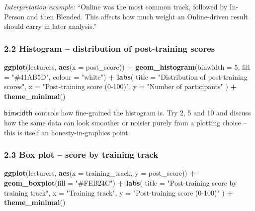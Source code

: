 \documentclass[11pt]{article}
\newenvironment{Shaded}{\begin{snugshade}}{\end{snugshade}}
\newcommand{\AttributeTok}[1]{\textcolor[rgb]{0.13,0.29,0.53}{#1}}
\newcommand{\DecValTok}[1]{\textcolor[rgb]{0.00,0.00,0.81}{#1}}
\newcommand{\FunctionTok}[1]{\textcolor[rgb]{0.13,0.29,0.53}{\textbf{#1}}}
\newcommand{\NormalTok}[1]{#1}
\newcommand{\SpecialCharTok}[1]{\textcolor[rgb]{0.81,0.36,0.00}{\textbf{#1}}}
\newcommand{\StringTok}[1]{\textcolor[rgb]{0.31,0.60,0.02}{#1}}
\begin{document}
\emph{Interpretation example:} ``Online was the most common track,
followed by In-Person and then Blended. This affects how much weight an
Online-driven result should carry in later analysis.''

\hypertarget{histogram-distribution-of-post-training-scores}{%
\subsubsection{2.2 Histogram -- distribution of post-training
scores}\label{histogram-distribution-of-post-training-scores}}

\begin{Shaded}
\begin{Highlighting}[]
\FunctionTok{ggplot}\NormalTok{(lecturers, }\FunctionTok{aes}\NormalTok{(}\AttributeTok{x =}\NormalTok{ post\_score)) }\SpecialCharTok{+}
  \FunctionTok{geom\_histogram}\NormalTok{(}\AttributeTok{binwidth =} \DecValTok{5}\NormalTok{, }\AttributeTok{fill =} \StringTok{"\#41AB5D"}\NormalTok{, }\AttributeTok{colour =} \StringTok{"white"}\NormalTok{) }\SpecialCharTok{+}
  \FunctionTok{labs}\NormalTok{(}
    \AttributeTok{title =} \StringTok{"Distribution of post{-}training scores"}\NormalTok{,}
    \AttributeTok{x =} \StringTok{"Post{-}training score (0{-}100)"}\NormalTok{, }\AttributeTok{y =} \StringTok{"Number of participants"}
\NormalTok{  ) }\SpecialCharTok{+}
  \FunctionTok{theme\_minimal}\NormalTok{()}
\end{Highlighting}
\end{Shaded}

\texttt{binwidth} controls how fine-grained the histogram is. Try 2, 5
and 10 and discuss how the same data can look smoother or noisier purely
from a plotting choice -- this is itself an honesty-in-graphics point.

\hypertarget{box-plot-score-by-training-track}{%
\subsubsection{2.3 Box plot -- score by training
track}\label{box-plot-score-by-training-track}}

\begin{Shaded}
\begin{Highlighting}[]
\FunctionTok{ggplot}\NormalTok{(lecturers, }\FunctionTok{aes}\NormalTok{(}\AttributeTok{x =}\NormalTok{ training\_track, }\AttributeTok{y =}\NormalTok{ post\_score)) }\SpecialCharTok{+}
  \FunctionTok{geom\_boxplot}\NormalTok{(}\AttributeTok{fill =} \StringTok{"\#FEB24C"}\NormalTok{) }\SpecialCharTok{+}
  \FunctionTok{labs}\NormalTok{(}
    \AttributeTok{title =} \StringTok{"Post{-}training score by training track"}\NormalTok{,}
    \AttributeTok{x =} \StringTok{"Training track"}\NormalTok{, }\AttributeTok{y =} \StringTok{"Post{-}training score (0{-}100)"}
\NormalTok{  ) }\SpecialCharTok{+}
  \FunctionTok{theme\_minimal}\NormalTok{()}
\end{Highlighting}
\end{Shaded}
\end{document}
